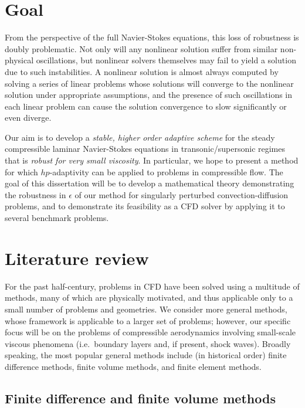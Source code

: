 \section{Goal}

From the perspective of the full Navier-Stokes equations, this loss of robustness is doubly problematic.  Not only will any nonlinear solution suffer from similar non-physical oscillations, but nonlinear solvers themselves may fail to yield a solution due to such instabilities.  A nonlinear solution is almost always computed by solving a series of linear problems whose solutions will converge to the nonlinear solution under appropriate assumptions, and the presence of such oscillations in each linear problem can cause the solution convergence to slow significantly or even diverge.  

Our aim is to develop a \emph{stable, higher order adaptive scheme} for the steady compressible laminar Navier-Stokes equations in transonic/supersonic regimes that is \emph{robust for very small viscosity}.  In particular, we hope to present a method for which $hp$-adaptivity can be applied to problems in compressible flow.  The goal of this dissertation will be to develop a mathematical theory demonstrating the robustness in $\epsilon$ of our method for singularly perturbed convection-diffusion problems, and to demonstrate its feasibility as a CFD solver by applying it to several benchmark problems.  

\section{Literature review}

For the past half-century, problems in CFD have been solved using a multitude of methods, many of which are physically motivated, and thus applicable only to a small number of problems and geometries. We consider more general methods, whose framework is applicable to a larger set of problems; however, our specific focus will be on the problems of compressible aerodynamics involving small-scale viscous phenomena (i.e.\ boundary layers and, if present, shock waves). Broadly speaking, the most popular general methods include (in historical order) finite difference methods, finite volume methods, and finite element methods.  

\subsection{Finite difference and finite volume methods}

